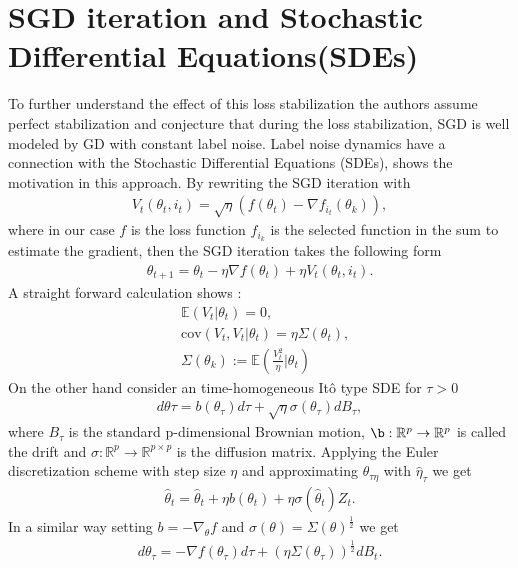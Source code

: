 \section{SGD iteration and Stochastic Differential Equations(SDEs)}
To further understand the effect of this loss stabilization the authors
assume perfect stabilization and conjecture that during the loss
stabilization, SGD is well modeled by GD with constant label noise.
\newline
Label noise dynamics have a connection with the Stochastic Differential
Equations (SDEs), \cite{li2018stochastic} shows the motivation in this
approach. By rewriting the SGD iteration with
\begin{align}
    V_t(\theta_t, i_t) = \sqrt{\eta} \left(f(\theta_t) - \nabla
    f_{i_t}(\theta_k)  \right),
\end{align}
where in our case $f$ is the loss function $f_{i_k}$ is the selected function
in the sum to estimate the gradient, then the SGD iteration takes the
following form
\begin{align}
    \theta_{t+1} = \theta_t - \eta \nabla f(\theta_t) + \eta
    V_t(\theta_t, i_t).
\end{align}
A straight forward calculation shows \cite{li2018stochastic}:
\begin{align}
    &\mathbb{E}(V_t|\theta_t) = 0, \\
    &\text{cov}(V_t, V_t|\theta_t) = \eta \Sigma(\theta_t), \\
    &\Sigma(\theta_k) :=
    \mathbb{E}\left(\frac{V_t^{2}}{\eta}\Big|\theta_t \right)
\end{align}
On the other hand consider an time-homogeneous It\^o type SDE for $\tau>0$
\begin{align}
    \label{eq: sde-sgd-dynamics}
    d\theta\tau = b(\theta_\tau)d\tau
    +\sqrt{\eta}\sigma(\theta_\tau)dB_\tau,
\end{align}
where $B_\tau$ is the standard p-dimensional Brownian motion, $\b:
\mathbb{R}^{p}\to \mathbb{R}^{p}$ is called the drift and $\sigma:
\mathbb{R}^{p} \to \mathbb{R}^{p\times p}$ is the diffusion matrix. Applying
the Euler discretization scheme with step size $\eta$ and approximating
$\theta_{\tau\eta}$ with $\hat{\eta}_\tau$ we get
\begin{align}
    \hat{\theta}_t= \hat{\theta}_t + \eta b(\theta_t)
    +\eta \sigma(\hat{\theta}_t)Z_t.
\end{align}
In a similar way setting $b = -\nabla_\theta f $ and $\sigma(\theta) =
\Sigma(\theta)^{\frac{1}{2}}$ we get
\begin{align}
    d\theta_\tau = -\nabla f(\theta_\tau)d\tau
    + (\eta\Sigma(\theta_\tau))^{\frac{1}{2}} dB_t.
\end{align}
